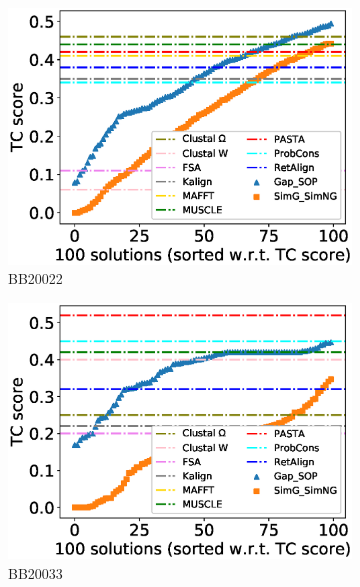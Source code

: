 \begin{figure}[!htbp]
\begin{adjustwidth}{-1.5cm}{-1cm}
\begin{subfigure}{0.22\textwidth}
			\includegraphics[width=\columnwidth]{Figure/summary/precomputedInit/Balibase/BB20022_tc_density_single_run_2}
			\caption{BB20022}
		\end{subfigure}
		\begin{subfigure}{0.22\textwidth}
			\includegraphics[width=\columnwidth]{Figure/summary/precomputedInit/Balibase/BB20033_tc_density_single_run_2}
			\caption{BB20033}
		\end{subfigure}
		\begin{subfigure}{0.22\textwidth}

\end{subfigure}
\end{adjustwidth}
\end{figure}

